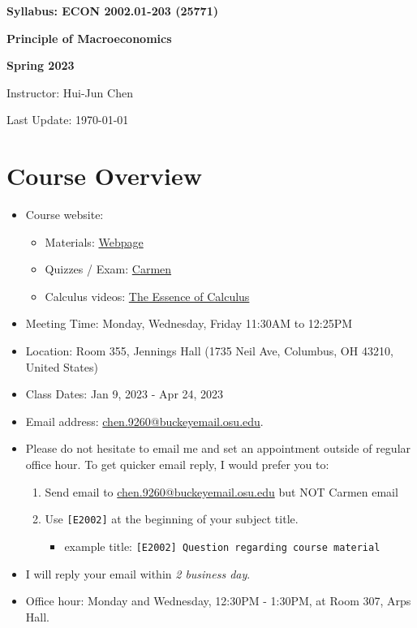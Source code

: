 \documentclass[12pt]{article}
\begin{document}
\centerline{\huge\bf Syllabus: ECON 2002.01-203 (25771)}
\medskip
\centerline{\LARGE \bf Principle of Macroeconomics}
\medskip
\centerline{\LARGE \bf Spring 2023}
\medskip
\centerline{\Large Instructor: Hui-Jun Chen}
\centerline{Last Update: \today}

\medskip

\section*{Course Overview}
\begin{itemize}

    \item Course website:
    \begin{itemize}
        \item Materials: \href{https://huijunchen9260.github.io/PrincipleMacroSpring2023.html}{Webpage}
        \item Quizzes / Exam: \href{https://osu.instructure.com/courses/136855}{Carmen}
        \item Calculus videos: \href{https://www.youtube.com/watch?v=WUvTyaaNkzM&list=PLZHQObOWTQDMsr9K-rj53DwVRMYO3t5Yr}{The Essence of Calculus}
    \end{itemize}
    \item Meeting Time: Monday, Wednesday, Friday 11:30AM to 12:25PM
    \item Location: Room 355, Jennings Hall (1735 Neil Ave, Columbus, OH 43210, United States)
    \item Class Dates: Jan 9, 2023 - Apr 24, 2023
    \item Email address: \href{chen.9260@buckeyemail.osu.edu}{chen.9260@buckeyemail.osu.edu}.
    \item Please do not hesitate to email me and set an appointment outside of regular office hour. To get quicker email reply, I would prefer you to:
    \begin{enumerate}
        \item Send email to \href{chen.9260@buckeyemail.osu.edu}{chen.9260@buckeyemail.osu.edu} but NOT Carmen email
        \item Use \texttt{[E2002]} at the beginning of your subject title.
        \begin{itemize}
            \item example title: \texttt{[E2002] Question regarding course material}
        \end{itemize}
    \end{enumerate}
    \item I will reply your email within \textit{2 business day}.
    \item Office hour: Monday and Wednesday, 12:30PM - 1:30PM, at Room 307, Arps Hall.
\end{itemize}
\end{document}

